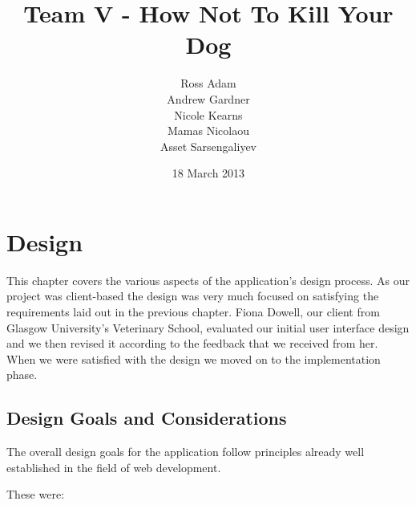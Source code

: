 \documentclass{l3proj}
\begin{document}
\title{Team V - How Not To Kill Your Dog}
\author{Ross Adam \\
        Andrew Gardner \\
        Nicole Kearns \\
        Mamas Nicolaou \\
        Asset Sarsengaliyev}
\date{18 March 2013}
\maketitle

\chapter{Design}
\label{design}

This chapter covers the various aspects of the application's design process. As our project was client-based the design was very much focused on satisfying the requirements laid out in the previous chapter. Fiona Dowell, our client from Glasgow University's Veterinary School, evaluated our initial user interface design and we then revised it according to the feedback that we received from her. When we were satisfied with the design we moved on to the implementation phase.

\section{Design Goals and Considerations}

The overall design goals for the application follow principles already well established in the field of web development.

These were:
\end{document}
